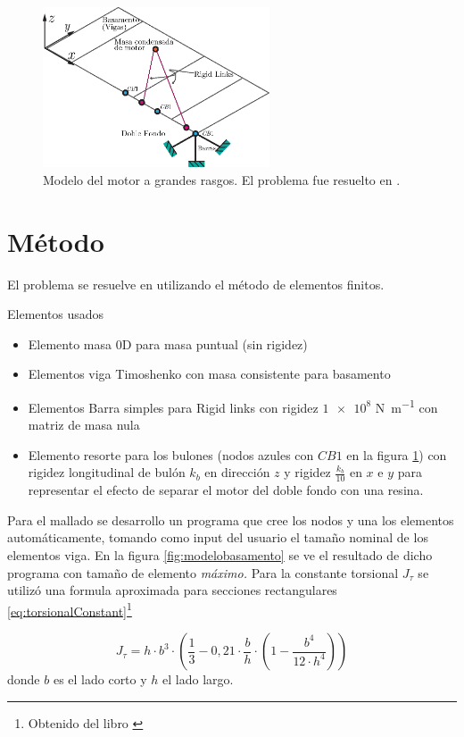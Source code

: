 \documentclass[onecolumn,10pt,titlepage,a4paper]{article}
\begin{document}
\begin{figure}[htb!]
	\centering
	\includegraphics[width=0.6\textwidth]{fig/modelomotor.eps}
	\caption{Modelo del motor a grandes rasgos. El problema fue resuelto en \Matlab.}
	\label{fig:modelomotor}
\end{figure}

\section{Método}
El problema se resuelve en \Matlab{} utilizando el método de elementos finitos.

Elementos usados
\begin{itemize}
	\item Elemento masa 0D para masa puntual (sin rigidez)
	\item Elementos viga Timoshenko con masa consistente para basamento
	\item Elementos Barra simples para Rigid links con rigidez $\num{1e8}$ \si{\newton \per \meter} con matriz de masa nula
	\item Elemento resorte para los bulones (nodos azules con $CB1$ en la figura \ref{fig:modelomotor}) con rigidez longitudinal de bulón $k_b$ en dirección $z$ y rigidez $\frac{k_b}{10}$ en $x$ e $y$ para representar el efecto de separar el motor del doble fondo con una resina.
\end{itemize}

Para el mallado se desarrollo un programa que cree los nodos y una los elementos automáticamente, tomando como input del usuario el tamaño nominal de los elementos viga. En la figura \ref{fig:modelobasamento} se ve el resultado de dicho programa con tamaño de elemento \textit{máximo.} Para la constante torsional $J_\tau$ se utilizó una formula aproximada para secciones rectangulares \eqref{eq:torsionalConstant}\footnote{Obtenido del libro \cite{young2002roark}}

\begin{equation} \label{eq:torsionalConstant}
J_{\tau}=h \cdot b^{3} \cdot\left(\frac{1}{3}-0,21 \cdot \frac{b}{h} \cdot\left(1-\frac{b^{4}}{12 \cdot h^{4}}\right)\right)
\end{equation}
donde $b$ es el lado corto y $h$ el lado largo.
\end{document}
